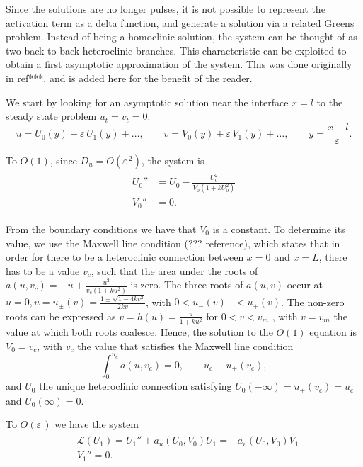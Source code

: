 \documentclass[a4paper,10pt]{article}
\newcommand{\Ep}{\ensuremath{\varepsilon\,}}
\begin{document}
Since the solutions are no longer pulses, it is not possible to represent the activation term as a delta function, and generate a solution via a related Greens problem. Instead of being a homoclinic solution, the system can be thought of as two back-to-back heteroclinic branches. This characteristic can be exploited to obtain a first asymptotic approximation of the system. This was done originally in ref***, and is added here for the benefit of the reader.

We start by looking for an asymptotic solution near the interface $x=l$ to the steady state problem $u_t = v_t = 0$:
% 
$$
u=U_0(y) + \Ep U_1(y)+\ldots, \qquad v=V_0(y) + \Ep V_1(y)+\ldots, \qquad y=\frac{x-l}{\Ep}.
$$

To $O(1)$, since $D_u = O(\Ep^2)$, the system is
% 
\begin{equation}
\label{eqn:order1}
\begin{split}
\begin{aligned}
	U_0'' &= U_0 - \frac{U_0^2}{V_0(1+kU_0^2)}\\
	V_0'' &= 0.
\end{aligned}
\end{split}
\end{equation}

From the boundary conditions we have that $V_0$ is a constant. To determine its value, we use the Maxwell line condition (??? reference), which states that in order for there to be a heteroclinic connection between $x=0$ and $x=L$, there has to be a value $v_c$, such that the area under the roots of $a(u,v_c) = -u +  \frac{u^2}{v_c(1+ku^2)}$ is zero. The three roots of $a(u,v)$ occur at $u=0, u=u_{\pm}(v) = \frac{1\pm\sqrt{1-4kv^2}}{2kv}$, with $0<u_-(v)-<u_+(v)$. The non-zero roots can be expressed as $v=h(u)=\frac{u}{1+ku^2}$ for $0<v<v_m$ , with $v=v_m$ the value at which both roots coalesce. Hence, the solution to the $O(1)$ equation is $V_0=v_c$, with $v_c$ the value that satisfies the Maxwell line condition
% 
\begin{equation}
\label{eqn:maxwell}
\int_0^{u_c}a(u,v_c)=0,\qquad u_c\equiv u_+(v_c),
\end{equation}
% 
and $U_0$ the unique heteroclinic connection satisfying $U_0(-\infty)=u_+(v_c)=u_c$ and $U_0(\infty)=0$.

To $O(\Ep)$ we have the system
% 
\begin{equation}
\label{eqn:order_eps}
\begin{split}
\begin{aligned}
	&\mathcal{L}(U_1) = U_1'' + a_u(U_0,V_0)U_1 = -a_v(U_0,V_0)V_1\\
	&V_1'' = 0.
\end{aligned}
\end{split}
\end{equation}
\end{document}
